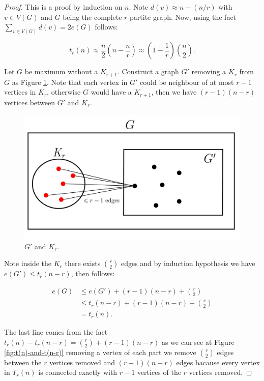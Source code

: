 \documentclass[12pt,twoside,a4paper]{book}
\numberwithin{equation}{section}
\theoremstyle{remark}
\begin{document}
\begin{proof}
This is a proof by induction on $n$. Note $d(v) \approx n-(n/r)$ with $v \in V(G)$ and $G$ being the complete $r$-partite graph. Now, using the fact $\sum_{v\in V(G)} d(v) = 2 e(G)$ follows:

$$ t_r(n) \approx \frac{n}{2}\left(n-\frac{n}{r}\right) \approx \left(1-\frac{1}{r}\right) \binom{n}{2}.$$


 Let $G$ be maximum without a $K_{r+1}$. Construct a graph $G'$ removing a $K_r$ from $G$ as Figure \ref{fig:G'andKr}. Note that each vertex in $G'$ could be neighbour of at most $r-1$ vertices in $K_r$, otherwise $G$ would have a $K_{r+1}$, then we have $(r-1)(n-r)$ vertices between $G'$ and $K_r$.
 
 \begin{figure}[H]
     \centering
     \includegraphics[scale=1]{Figuras/Kr+1-livre-prova-turan.jpg}
     \caption{$G'$ and $K_r$.}
     \label{fig:G'andKr}
\end{figure}

Note inside the $K_r$ there exists $\binom{r}{2}$ edges and by induction hypothesis we have $e(G') \leq t_r(n-r)$, then follows:

\begin{align*}
e(G) &\leq e(G') + (r-1)(n-r) + \binom{r}{2}\\
&\leq t_r(n-r) +(r-1)(n-r) + \binom{r}{2}\\
&= t_r(n).
\end{align*}

The last line comes from the fact $t_r(n) - t_r(n-r) = \binom{r}{2} + (r-1)(n-r)$ as we can see at Figure \ref{fig:t(n)-and-t(n-r)} removing a vertex of each part we remove $\binom{r}{2}$ edges between the $r$ vertices removed and $(r-1)(n-r)$ edges  bacause every vertex in $T_r(n)$ is connected exactly with $r-1$ vertices of the $r$ vertices removed.   


\end{proof}
\end{document}
